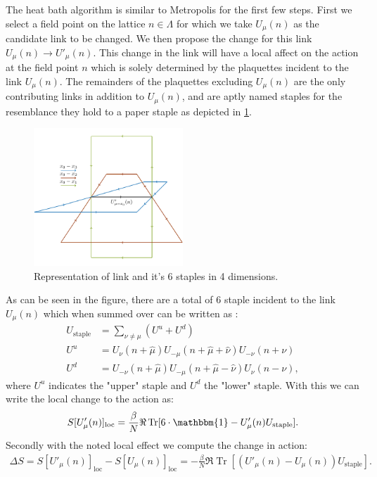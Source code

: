 \documentclass[english,twoside,openright]{UH_TCM_MSc}
\DeclareMathOperator{\Tr}{Tr}
\newcommand{\id}{\mathbbm{1}}
\begin{document}
The heat bath algorithm is similar to Metropolis for the first few steps. First we select a field point on the lattice $n \in \Lambda$ for which we take $U_{\mu}(n)$ as the candidate link to be changed. We then propose the change for this link $U_{\mu}(n) \rightarrow U'_{\mu}(n)$. This change in the link will have a local affect on the action at the field point $n$ which is solely determined by the plaquettes incident to the link $U_{\mu}(n)$. The remainders of the plaquettes excluding $U_{\mu}(n)$ are the only contributing links in addition to $U_{\mu}(n)$, and are aptly named staples for the resemblance they hold to a paper staple as depicted in \ref{fig:staplesum}. 
\begin{figure}[htpb]
    \centering
    \includegraphics[width=0.5\textwidth]{final_plots/misc/staplesum2.pdf}
    \caption{Representation of link and it's 6 staples in 4 dimensions.}
    \label{fig:staplesum}
\end{figure}
As can be seen in the figure, there are a total of 6 staple incident to the link $U_\mu(n)$ which when summed over can be written as \cite[ch. 4.1.4]{gattringer2009quantum}:
\begin{align}
    U_{\text{staple}} &= \sum_{\nu \neq \mu} (U^{u} + U^{d}) \\
    U^u &= U_\nu(n+\hat\mu)U_{-\mu}(n+\hat\mu+\hat\nu)U_{-\nu}(n+\nu) \\
    U^d &= U_{-\nu}(n+\hat\mu)U_{-\mu}(n+\hat\mu-\hat\nu)U_{\nu}(n-\nu),
\end{align}
where $U^{u}$ indicates the "upper" staple and $U^{d}$ the "lower" staple. With this we can write the local change to the action as:
\begin{align}
    S[U'_\mu(n)]_{\text{loc}} = \frac{\beta}{N}\Re \Tr[6\cdot\id-U_\mu'(n)U_{\text{staple}}].
\end{align}
Secondly with the noted local effect we compute the change in action:
\begin{align}
    \Delta S = S[U'_\mu(n)]_{\text{loc}} - S[U_\mu(n)]_{\text{loc}} = -\frac{\beta}{N}\Re \Tr[(U'_\mu(n) - U_\mu(n))U_{\text{staple}}].
\end{align}
\end{document}
